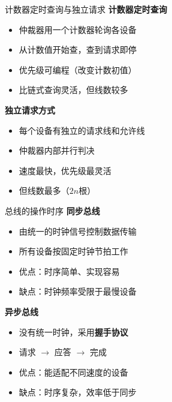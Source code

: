 \documentclass[10pt, aspectratio=169]{beamer}
\begin{document}
\begin{frame}{计数器定时查询与独立请求}
    \textbf{计数器定时查询}
    \begin{itemize}
        \item 仲裁器用一个计数器轮询各设备
        \item 从计数值开始查，查到请求即停
        \item 优先级可编程（改变计数初值）
        \item 比链式查询灵活，但线数较多
    \end{itemize}
    \vspace{0.3em}
    \textbf{独立请求方式}
    \begin{itemize}
        \item 每个设备有独立的请求线和允许线
        \item 仲裁器内部并行判决
        \item 速度最快，优先级最灵活
        \item 但线数最多（$2n$根）
    \end{itemize}
\end{frame}

\begin{frame}{总线的操作时序}
    \textbf{同步总线}
    \begin{itemize}
        \item 由统一的时钟信号控制数据传输
        \item 所有设备按固定时钟节拍工作
        \item 优点：时序简单、实现容易
        \item 缺点：时钟频率受限于最慢设备
    \end{itemize}
    \vspace{0.3em}
    \textbf{异步总线}
    \begin{itemize}
        \item 没有统一时钟，采用\textbf{握手协议}
        \item 请求 $\rightarrow$ 应答 $\rightarrow$ 完成
        \item 优点：能适配不同速度的设备
        \item 缺点：时序复杂，效率低于同步
    \end{itemize}
\end{frame}
\end{document}
